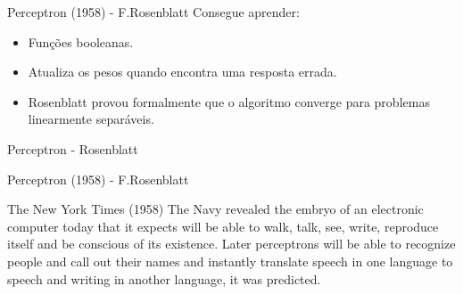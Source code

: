 \begin{frame}{Perceptron (1958) - F.Rosenblatt}
  Consegue aprender:
  \begin{itemize}
    \item Funções booleanas.
    \item Atualiza os pesos quando encontra uma resposta errada.
    \item Rosenblatt provou formalmente que o algoritmo converge para problemas linearmente separáveis.
  \end{itemize}
\end{frame}

\begin{frame}{Perceptron - Rosenblatt}

  \begin{figure}
  \centering
  \end{figure}

  \begin{figure}
  \centering
  \end{figure}

\end{frame}

\begin{frame}{Perceptron (1958) - F.Rosenblatt}
  \begin{block}{The New York Times (1958) \cite{olazaran1996sociological}}
    The Navy revealed the embryo of an electronic computer today that it expects will be able to walk, talk, see, write, reproduce itself and be conscious of its existence. Later perceptrons will be able to recognize people and call out their names and instantly translate speech in one language to speech and writing in another language, it was predicted.
  \end{block}
\end{frame}

